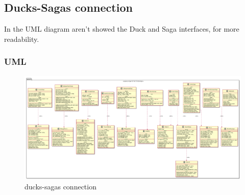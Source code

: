
	\subsection{Ducks-Sagas connection}
	In the UML diagram aren't showed the Duck and Saga interfaces, for more readability.
	\subsubsection{UML}
	\begin{figure}[h]
		\centering
		\includegraphics[width=1\linewidth]{"../diagrammi/redux/ducks-sagas connection"}
		\caption{ducks-sagas connection}
		\label{fig:Ducks-sagas connection}
	\end{figure}
